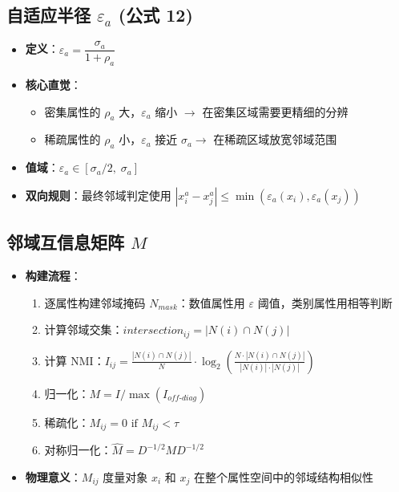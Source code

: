\documentclass[11pt,a4paper]{ctexart}
\begin{document}
\subsection{自适应半径 $\varepsilon_a$ (公式 12)}

\begin{itemize}[leftmargin=*]
    \item \textbf{定义}：$\varepsilon_a = \dfrac{\sigma_a}{1 + \rho_a}$
    \item \textbf{核心直觉}：
    \begin{itemize}
        \item 密集属性的 $\rho_a$ 大，$\varepsilon_a$ 缩小 $\to$ 在密集区域需要更精细的分辨
        \item 稀疏属性的 $\rho_a$ 小，$\varepsilon_a$ 接近 $\sigma_a \to$ 在稀疏区域放宽邻域范围
    \end{itemize}
    \item \textbf{值域}：$\varepsilon_a \in [\sigma_a/2,\; \sigma_a]$
    \item \textbf{双向规则}：最终邻域判定使用 $|x_i^a - x_j^a| \leq \min(\varepsilon_a(x_i), \varepsilon_a(x_j))$
\end{itemize}

\subsection{邻域互信息矩阵 $M$}

\begin{itemize}[leftmargin=*]
    \item \textbf{构建流程}：
    \begin{enumerate}
        \item 逐属性构建邻域掩码 $N_{mask}$：数值属性用 $\varepsilon$ 阈值，类别属性用相等判断
        \item 计算邻域交集：$intersection_{ij} = |N(i) \cap N(j)|$
        \item 计算 NMI：$I_{ij} = \frac{|N(i) \cap N(j)|}{N} \cdot \log_2\left(\frac{N \cdot |N(i) \cap N(j)|}{|N(i)| \cdot |N(j)|}\right)$
        \item 归一化：$M = I / \max(I_{off\text{-}diag})$
        \item 稀疏化：$M_{ij} = 0 \text{ if } M_{ij} < \tau$
        \item 对称归一化：$\hat{M} = D^{-1/2} M D^{-1/2}$
    \end{enumerate}
    \item \textbf{物理意义}：$M_{ij}$ 度量对象 $x_i$ 和 $x_j$ 在整个属性空间中的邻域结构相似性
\end{itemize}
\end{document}
